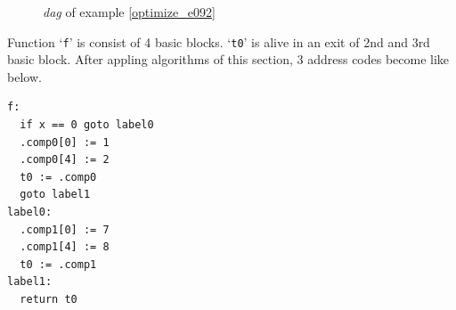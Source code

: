 \begin{Example}
\begin{figure}[htbp]
\begin{center}
\caption{{\em dag} of example \ref{optimize_e092}}
\label{optimize_e093}
\end{center}
\end{figure}
Function `{\tt{f}}' is consist of 4 basic blocks.
`{\tt{t0}}' is
alive in an exit of 2nd and 3rd basic block.
After appling algorithms of this section,
3 address codes become like below.
\begin{verbatim}
f:
  if x == 0 goto label0
  .comp0[0] := 1
  .comp0[4] := 2
  t0 := .comp0
  goto label1
label0:
  .comp1[0] := 7
  .comp1[4] := 8
  t0 := .comp1
label1:
  return t0
\end{verbatim}
\end{Example}

\begin{Example}
\label{optimize_e094}
\begin{verbatim}


\end{verbatim}
\end{Example}
